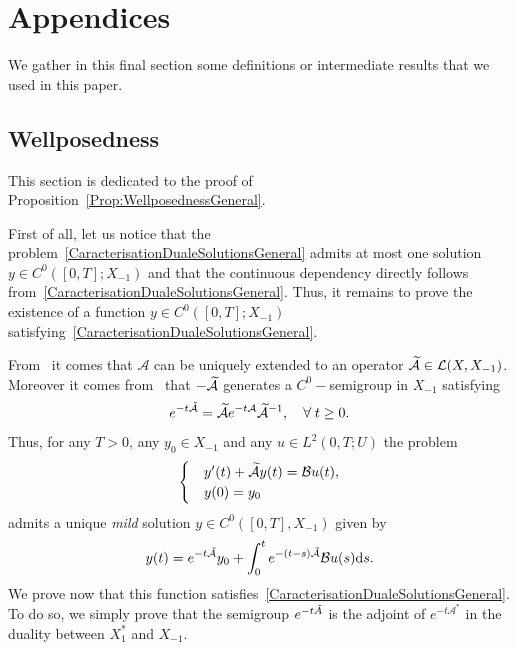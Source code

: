 \documentclass[10pt]{amsart}
\theoremstyle{definition}\newtheorem{defi}[theo]{Definition}\newtheorem{rema}[theo]{Remark}\newtheorem{exam}[theo]{Example}\newtheorem{exem}[theo]{Example}\newtheorem{nota}[theo]{Notation}
\newcommand\A{\mathcal{A}}
\newcommand\As{\mathcal{A}^*}
\newcommand\B{\mathcal{B}}
\newcommand{\Xuns}{X_1^*}
\newcommand{\Xmun}{X_{-1}}
\newcommand{\LL}{\mathcal{L}}
\newcommand{\md}{\mathrm{d}}
\let\oldtilde\tilde
\renewcommand*{\tilde}[1]{\mathchoice{\widetilde{#1}}{\widetilde{#1}}{\oldtilde{#1}}{\oldtilde{#1}}}\let\oldexists\exists
\renewcommand*{\exists}{\mathrel{\oldexists}}
\let\oldforall\forall
\renewcommand*{\forall}{\mathrel{\oldforall}}
\begin{document}
\section{Appendices} \label{Sec:Annexe}

We gather in this final section some definitions or intermediate results that we used in this paper.


\subsection{Wellposedness} \label{Sec:AnnexeWellposedness}


This section is dedicated to the proof of Proposition~\ref{Prop:WellposednessGeneral}.

First of all, let us notice that the problem~\eqref{CaracterisationDualeSolutionsGeneral} admits at most one solution $y \in C^0([0,T]; \Xmun)$ and that the continuous dependency directly follows from~\eqref{CaracterisationDualeSolutionsGeneral}. Thus, it remains to prove the existence of a function $y \in C^0([0,T]; \Xmun)$ satisfying~\eqref{CaracterisationDualeSolutionsGeneral}.

From~\cite[Proposition~2.10.3]{TucsnakWeissBook} it comes that $\A$ can be uniquely extended to an operator $\tilde{\A} \in \LL(X, \Xmun)$. Moreover it comes from~\cite[Proposition~2.10.4]{TucsnakWeissBook} that $-\tilde{\A}$ generates a $C^0-$semigroup in $\Xmun$ satisfying
\begin{equation*}\label{Def:SemiGroupeEtendu}
e^{-t \tilde{\A}} = \tilde{\A} e^{-t \A} \tilde{\A}^{-1}, \quad \forall t \geq 0.
\end{equation*}
Thus, for any $T>0$, any $y_0 \in \Xmun$ and any $u \in L^2(0,T ; U)$ the problem
\begin{equation*}\label{systemeEtendu}
\begin{cases}
&y'(t) + \tilde{\A} y(t) = \B u(t),
\\
&y(0) = y_0
\end{cases}
\end{equation*}
admits a unique \emph{mild} solution $y \in C^0([0,T], \Xmun)$ given by
\begin{equation}\label{MildSolution}
y(t) = e^{-t \tilde{\A}} y_0 + \int_0^t e^{-(t-s) \tilde{\A}} \B u(s) \md s.
\end{equation}
We prove now that this function satisfies~\eqref{CaracterisationDualeSolutionsGeneral}. To do so, we simply prove that the semigroup $e^{-t \tilde{A}}$ is the adjoint of $e^{-t\As}$ in the duality between $\Xuns$ and $\Xmun$.
\end{document}
